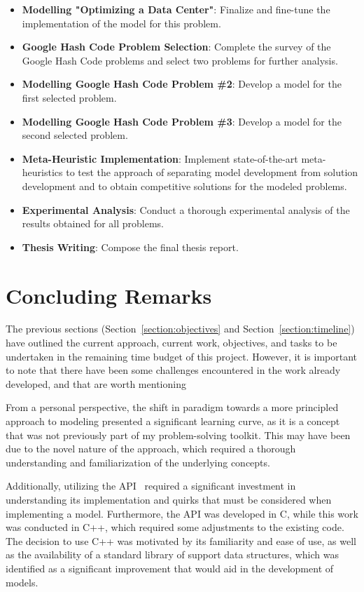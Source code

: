 \begin{itemize}
      \item \textbf{Modelling "Optimizing a Data Center"}: Finalize and fine-tune
            the implementation of the model for this problem.
      \item \textbf{Google Hash Code Problem Selection}: Complete the survey of the
            Google Hash Code problems and select two problems for further analysis.
      \item \textbf{Modelling Google Hash Code Problem \#2}: Develop a model for the
            first selected problem.
      \item \textbf{Modelling Google Hash Code Problem \#3}: Develop a model for the
            second selected problem.
      \item \textbf{Meta-Heuristic Implementation}: Implement state-of-the-art
            meta-heuristics to test the approach of separating model development from
            solution development and to obtain competitive solutions for the modeled
            problems.
      \item \textbf{Experimental Analysis}: Conduct a thorough experimental analysis
            of the results obtained for all problems.
      \item \textbf{Thesis Writing}: Compose the final thesis report.
\end{itemize}

\section{Concluding Remarks}
\label{section:remarks}

The previous sections (Section~\ref{section:objectives} and
Section~\ref{section:timeline}) have outlined the current approach, current
work, objectives, and tasks to be undertaken in the remaining time budget of
this project. However, it is important to note that there have been some
challenges encountered in the work already developed, and that are worth
mentioning

From a personal perspective, the shift in paradigm towards a more principled
approach to modeling presented a significant learning curve, as it is a concept
that was not previously part of my problem-solving toolkit. This may have been
due to the novel nature of the approach, which required a thorough understanding
and familiarization of the underlying concepts.

Additionally, utilizing the API~\cite{outeiro2021application} required a
significant investment in understanding its implementation and quirks that must
be considered when implementing a model. Furthermore, the API was developed in
C, while this work was conducted in C++, which required some adjustments to the
existing code. The decision to use C++ was motivated by its familiarity and ease
of use, as well as the availability of a standard library of support data
structures, which was identified as a significant improvement that would aid in
the development of models.

